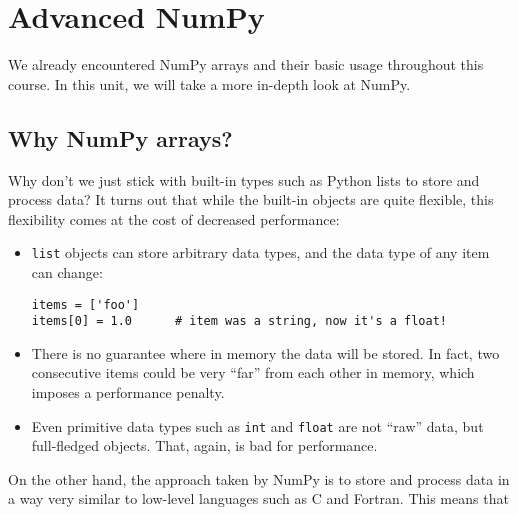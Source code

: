 \documentclass[10pt]{scrartcl}
\begin{document}
    
    \maketitle
    \tableofcontents

    

    
    \hypertarget{advanced-numpy}{%
\section{Advanced NumPy}\label{advanced-numpy}}

We already encountered NumPy arrays and their basic usage throughout
this course. In this unit, we will take a more in-depth look at NumPy.

\hypertarget{why-numpy-arrays}{%
\subsection{Why NumPy arrays?}\label{why-numpy-arrays}}

Why don't we just stick with built-in types such as Python lists to
store and process data? It turns out that while the built-in objects are
quite flexible, this flexibility comes at the cost of decreased
performance:

\begin{itemize}
\item
  \texttt{list} objects can store arbitrary data types, and the data
  type of any item can change:

\begin{verbatim}
items = ['foo']
items[0] = 1.0      # item was a string, now it's a float!
\end{verbatim}
\item
  There is no guarantee where in memory the data will be stored. In
  fact, two consecutive items could be very ``far'' from each other in
  memory, which imposes a performance penalty.
\item
  Even primitive data types such as \texttt{int} and \texttt{float} are
  not ``raw'' data, but full-fledged objects. That, again, is bad for
  performance.
\end{itemize}

On the other hand, the approach taken by NumPy is to store and process
data in a way very similar to low-level languages such as C and Fortran.
This means that
\end{document}
